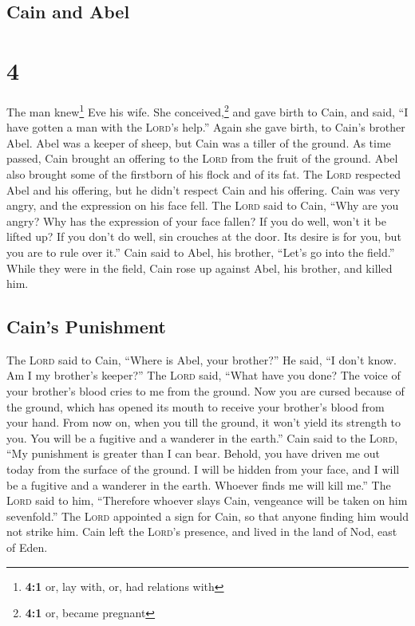 \hypertarget{cain-and-abel}{%
\subsection{Cain and Abel}\label{cain-and-abel}}

\hypertarget{section-3}{%
\section{4}\label{section-3}}

 The man knew\footnote{\textbf{4:1} or, lay with, or, had
  relations with} Eve his wife. She conceived,\footnote{\textbf{4:1} or,
  became pregnant} and gave birth to Cain, and said, ``I have gotten a
man with the \textsc{Lord}'s help.''  Again she gave
birth, to Cain's brother Abel. Abel was a keeper of sheep, but Cain was
a tiller of the ground.  As time passed, Cain brought an
offering to the \textsc{Lord} from the fruit of the ground.
 Abel also brought some of the firstborn of his flock and
of its fat. The \textsc{Lord} respected Abel and his offering,
 but he didn't respect Cain and his offering. Cain was
very angry, and the expression on his face fell.  The
\textsc{Lord} said to Cain, ``Why are you angry? Why has the expression
of your face fallen?  If you do well, won't it be lifted
up? If you don't do well, sin crouches at the door. Its desire is for
you, but you are to rule over it.''  Cain said to Abel,
his brother, ``Let's go into the field.'' While they were in the field,
Cain rose up against Abel, his brother, and killed him.

\hypertarget{cains-punishment}{%
\subsection{Cain's Punishment}\label{cains-punishment}}

 The \textsc{Lord} said to Cain, ``Where is Abel, your
brother?'' He said, ``I don't know. Am I my brother's keeper?''
 The \textsc{Lord} said, ``What have you done? The voice
of your brother's blood cries to me from the ground.  Now
you are cursed because of the ground, which has opened its mouth to
receive your brother's blood from your hand.  From now
on, when you till the ground, it won't yield its strength to you. You
will be a fugitive and a wanderer in the earth.''  Cain
said to the \textsc{Lord}, ``My punishment is greater than I can bear.
 Behold, you have driven me out today from the surface of
the ground. I will be hidden from your face, and I will be a fugitive
and a wanderer in the earth. Whoever finds me will kill me.''
 The \textsc{Lord} said to him, ``Therefore whoever slays
Cain, vengeance will be taken on him sevenfold.'' The \textsc{Lord}
appointed a sign for Cain, so that anyone finding him would not strike
him.  Cain left the \textsc{Lord}'s presence, and lived
in the land of Nod, east of Eden.

